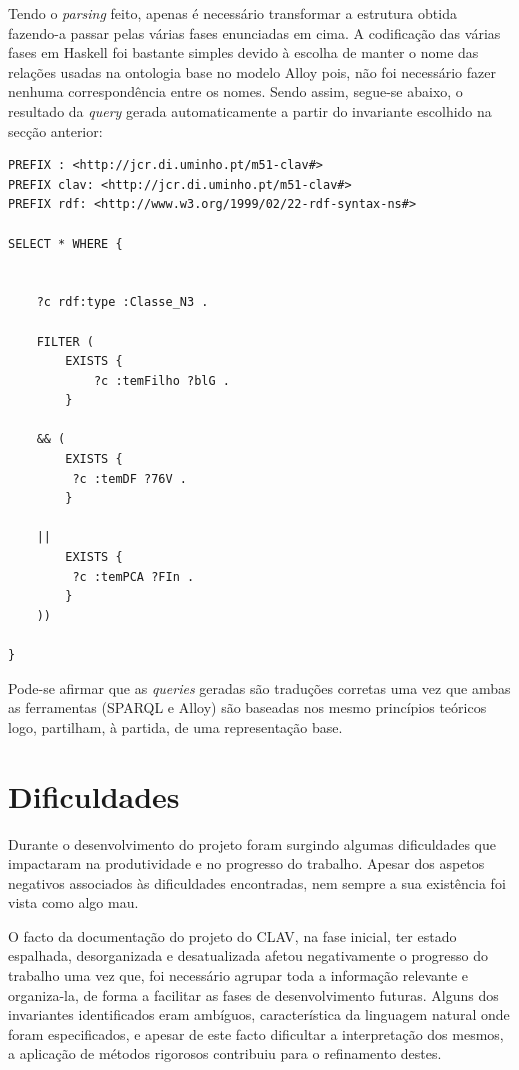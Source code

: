 \documentclass[tikz,runningheads,a4paper]{llncs}
\begin{document}
Tendo o \textit{parsing} feito, apenas é necessário transformar a estrutura
obtida fazendo-a passar pelas várias fases enunciadas em cima. A codificação das
várias fases em Haskell foi bastante simples devido à escolha de manter o nome
das relações usadas na ontologia base no modelo Alloy pois, não foi necessário
fazer nenhuma correspondência entre os nomes. Sendo assim, segue-se abaixo, o resultado da 
\textit{query} gerada automaticamente a partir do invariante escolhido na secção
anterior:

\begin{lstlisting}[language=sparql, frame=single, basicstyle=\scriptsize]
PREFIX : <http://jcr.di.uminho.pt/m51-clav#> 
PREFIX clav: <http://jcr.di.uminho.pt/m51-clav#> 
PREFIX rdf: <http://www.w3.org/1999/02/22-rdf-syntax-ns#> 

SELECT * WHERE {


    ?c rdf:type :Classe_N3 . 

    FILTER ( 
        EXISTS { 	
            ?c :temFilho ?blG . 
        } 

    && (
        EXISTS { 	
         ?c :temDF ?76V . 
        } 

    || 
        EXISTS { 	
         ?c :temPCA ?FIn . 
        } 
    ))

}
\end{lstlisting}

Pode-se afirmar que as \textit{queries} geradas são traduções corretas uma vez que ambas as
ferramentas (SPARQL e Alloy) são baseadas nos mesmo princípios teóricos logo,
partilham, à partida, de uma representação base.

\section{Dificuldades}

Durante o desenvolvimento do projeto foram surgindo algumas dificuldades que impactaram na produtividade e no progresso do trabalho. Apesar dos aspetos negativos associados às dificuldades encontradas, nem sempre a sua existência foi vista como algo mau.

O facto da documentação do projeto do CLAV, na fase inicial, ter estado espalhada, desorganizada e desatualizada afetou negativamente o progresso do trabalho uma vez que, foi necessário agrupar toda a informação relevante e organiza-la, de forma a facilitar as fases de desenvolvimento futuras. Alguns dos invariantes identificados eram ambíguos, característica da linguagem natural onde foram especificados, e apesar de este facto dificultar a interpretação dos mesmos, a aplicação de métodos rigorosos contribuiu para o refinamento destes.
\end{document}
